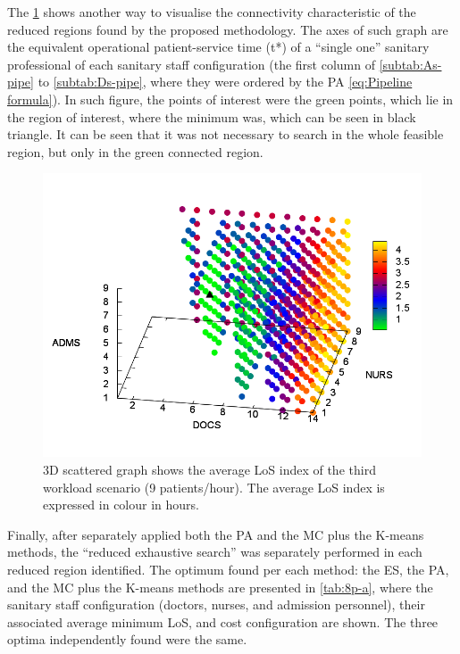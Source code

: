 \documentclass[11pt]{article} %
\begin{document}
The \ref{fig:3D-scattered-graph-50} shows another way to visualise
the connectivity characteristic of the reduced regions found by the
proposed methodology. The axes of such graph are the equivalent operational
patient-service time \foreignlanguage{american}{(t{*})} of a ``single
one'' sanitary professional of each sanitary staff configuration
(the first column of \ref{subtab:As-pipe} to \ref{subtab:Ds-pipe},
where they were ordered by the PA \ref{eq:Pipeline formula}). In
such figure, the points of interest were the green points, which lie
in the region of interest, where the minimum was, which can be seen
in black triangle. It can be seen that it was not necessary to search
in the whole feasible region, but only in the green connected region.
\begin{figure}[H]
\noindent \begin{centering}
\includegraphics[width=0.95\columnwidth,height=0.2\paperheight]{figs4/v0/6400-602-50-3D-scatter-LoS2}
\par\end{centering}

\caption{3D scattered graph shows the average LoS index of the third workload
scenario (9 patients/hour). The average LoS index is expressed in
colour in hours.\label{fig:3D-scattered-graph-50}}
\end{figure}


Finally, after separately applied both the PA and the MC plus the
K-means methods, the \textquotedblleft{}reduced exhaustive search\textquotedblright{}
was separately performed in each reduced region identified. The optimum
found per each method: the ES, the PA, and the MC plus the K-means
methods are presented in \ref{tab:8p-a}, where the sanitary staff
configuration (doctors, nurses, and admission personnel), their associated
average minimum LoS, and cost configuration are shown. The three optima
 independently found were the same. 
\end{document}
